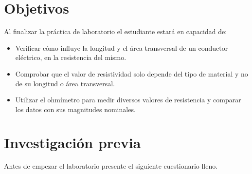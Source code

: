 \documentclass{report}
\newcommand{\obj}{Objetivos}
\newcommand{\inv}{Investigación previa}
\newcommand{\antesde}{Antes de empezar el laboratorio presente el siguiente cuestionario lleno.}
\begin{document}
\section{\obj}
Al finalizar la práctica de laboratorio el estudiante estará en capacidad de:
\begin{itemize}
\item Verificar cómo influye la longitud y el área transversal de un conductor eléctrico, en la resistencia del mismo.
\item	Comprobar que el valor de resistividad solo depende del tipo de material y no de su longitud o área transversal.
\item	Utilizar el ohmímetro para medir diversos valores de resistencia y comparar los datos con sus magnitudes nominales.
\end{itemize}
\section{\inv}
\antesde
\end{document}
